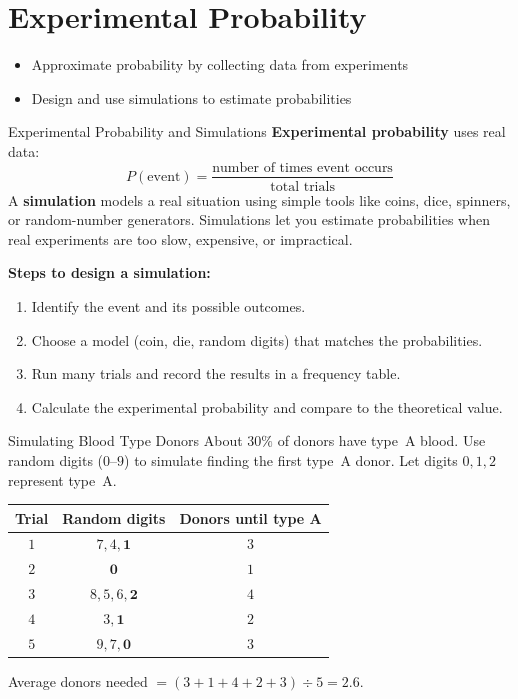 \section{Experimental Probability}

\begin{learningGoals}
\begin{itemize}
    \item Approximate probability by collecting data from experiments
    \item Design and use simulations to estimate probabilities
\end{itemize}
\end{learningGoals}

\begin{conceptBox}{Experimental Probability and Simulations}
\textbf{Experimental probability} uses real data:
$$P(\text{event}) = \frac{\text{number of times event occurs}}{\text{total trials}}$$
A \textbf{simulation} models a real situation using simple tools like coins, dice, spinners, or random-number generators. Simulations let you estimate probabilities when real experiments are too slow, expensive, or impractical.

\textbf{Steps to design a simulation:}
\begin{enumerate}[leftmargin=*]
    \item Identify the event and its possible outcomes.
    \item Choose a model (coin, die, random digits) that matches the probabilities.
    \item Run many trials and record the results in a frequency table.
    \item Calculate the experimental probability and compare to the theoretical value.
\end{enumerate}
\end{conceptBox}

\begin{workedExample}{Simulating Blood Type Donors}
About $30\%$ of donors have type~A blood. Use random digits ($0$--$9$) to simulate finding the first type~A donor. Let digits $0, 1, 2$ represent type~A.

\begin{center}
\begin{tabular}{c c c}
\textbf{Trial} & \textbf{Random digits} & \textbf{Donors until type A} \\
\hline
$1$ & $7, 4, \mathbf{1}$ & $3$ \\
$2$ & $\mathbf{0}$ & $1$ \\
$3$ & $8, 5, 6, \mathbf{2}$ & $4$ \\
$4$ & $3, \mathbf{1}$ & $2$ \\
$5$ & $9, 7, \mathbf{0}$ & $3$ \\
\end{tabular}
\end{center}
Average donors needed $= (3 + 1 + 4 + 2 + 3) \div 5 = 2.6$.
\end{workedExample}

